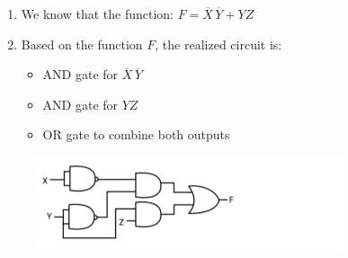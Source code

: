 \documentclass{article}
\begin{document}
\begin{enumerate}
    \item We know that the function:
    $ F = \overline{X} \, \overline{Y} + YZ $
    
    \item Based on the function \(F\), the realized circuit is:
    \begin{itemize}
        \item AND gate for \(\overline{X} \, \overline{Y}\)
        \item AND gate for \(YZ\)
        \item OR gate to combine both outputs
    \end{itemize}
\end{enumerate}
  
\begin{figure}[h!]
    \centering
    \includegraphics[width=0.8\textwidth]{RealizedCircuit.jpg}
\end{figure}
\end{document}
